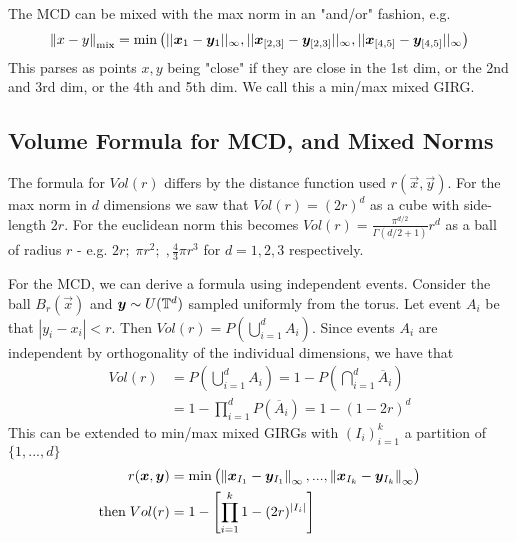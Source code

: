 The MCD can be mixed with the max norm in an "and/or" fashion, e.g.
\begin{equation}
    \left\lVert x - y\right\rVert_\text{mix} = \min \left ( ||\bm{x}_1 - \bm{y}_{1}||_\infty, ||\bm{x}_{[2,3]} - \bm{y}_{[2,3]}||_\infty, ||\bm{x}_{[4,5]} - \bm{y}_{[4,5]}||_\infty \right )
\end{equation}
This parses as points $x, y$ being "close" if they are close in the 1st dim, or the 2nd and 3rd dim, or the 4th and 5th dim. We call this a min/max mixed GIRG.


\subsection{Volume Formula for MCD, and Mixed Norms}
The formula for $Vol(r)$ differs by the distance function used $r(\vec{x}, \vec{y})$. For the max norm in $d$ dimensions we saw that $Vol(r) = (2r)^d$ as a cube with side-length $2r$. For the euclidean norm this becomes $Vol(r) = \frac{\pi^{d/2}}{\Gamma(d/2 + 1)} r^d$ as a ball of radius $r$ - e.g. $2r;\; \pi r^2;\;, \frac{4}{3} \pi r^3$ for $d=1, 2, 3$ respectively.

For the MCD, we can derive a formula using independent events. Consider the ball $B_r(\vec{x})$ and $\bm{y} \sim U(\mathbb{T}^d)$ sampled uniformly from the torus. Let event $A_i$ be that $|y_i - x_i| < r$. Then $Vol(r) = P(\bigcup_{i=1}^d A_i)$. Since events $A_i$ are independent by orthogonality of the individual dimensions,
we have that
\begin{align*}
    Vol(r) & = P \left (\bigcup_{i=1}^d A_i \right ) 
    = 1 - P \left ( \bigcap_{i=1}^d \overline{A}_i \right )
    \\
    &= 1 - \prod_{i=1}^d P(\overline{A}_i) = 1 - (1 - 2r)^d
\end{align*}
This can be extended to min/max mixed GIRGs with $(I_i)_{i=1}^k$ a partition of $\{1, ..., d\}$
\begin{align*}
    r(\bm{x}, \bm{y}) &= \min \left ( \left\lVert \bm{x}_{I_1} - \bm{y}_{I_1}\right\rVert_\infty, ..., \left\lVert \bm{x}_{I_k} - \bm{y}_{I_k}\right\rVert_\infty  \right )
    \\
    \text{then}\; Vol(r) &= 1 -  \left [ \prod_{i=1}^k 1 - (2r)^{|I_i|} \right ]
\end{align*}







